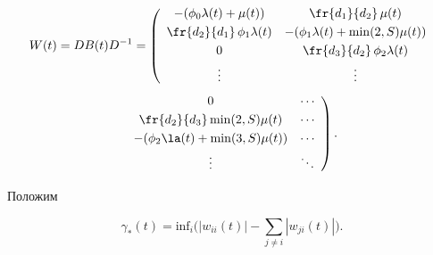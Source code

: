  

 \noindent

 \begin{multline*}

 W(t) = DB(t)D^{-1} = 

    \left(

    \begin{array}{cc}

        -(\phi_0\lambda(t) + \mu(t)) & \fr{d_1}{d_2}\,\mu(t)\\[3pt]                         

        \fr{d_2}{d_1}\,\phi_1\lambda(t) & -(\phi_1\lambda(t) + \min(2, S)\mu(t))\\[3pt]     

        0 & \fr{d_3}{d_2}\,\phi_2\lambda(t)\\[3pt]                                          

        \vdots   & \vdots                                                            

    \end{array}\right.\\[3pt]

\left.    \begin{array}{cc}

              0  & \cdots \\[3pt]                                    

              \fr{d_2}{d_3}\min(2, S)\mu(t)    & \cdots \\[3pt]      

              -(\phi_2\la(t) + \min(3, S)\mu(t)) &  \cdots \\[3pt]   

              \vdots  & \ddots   %

    \end{array}

    \right).


\end{multline*}



\vspace*{-2pt}



Положим



\noindent

\begin{equation*}

    \gamma_{*}(t) =  \mathrm{inf}_i \Bigg(|w_{ii}(t)| - \sum\limits_{j\neq i}

    |w_{ji}(t)|\Bigg). 


\end{equation*}



